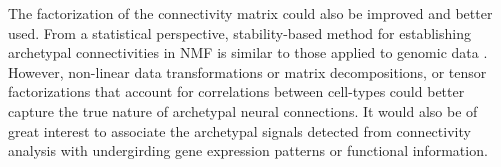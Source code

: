 The factorization of the connectivity matrix could also be improved and better used.
From a statistical perspective, stability-based method for establishing archetypal connectivities in NMF is similar to those applied to genomic data \cite{Wu2016-gg, Kotliar2019-yj}.
However, non-linear data transformations or matrix decompositions, or tensor factorizations that account for correlations between cell-types could better capture the true nature of archetypal neural connections.
It would also be of great interest to associate the archetypal signals detected from connectivity analysis with undergirding gene expression patterns or functional information.